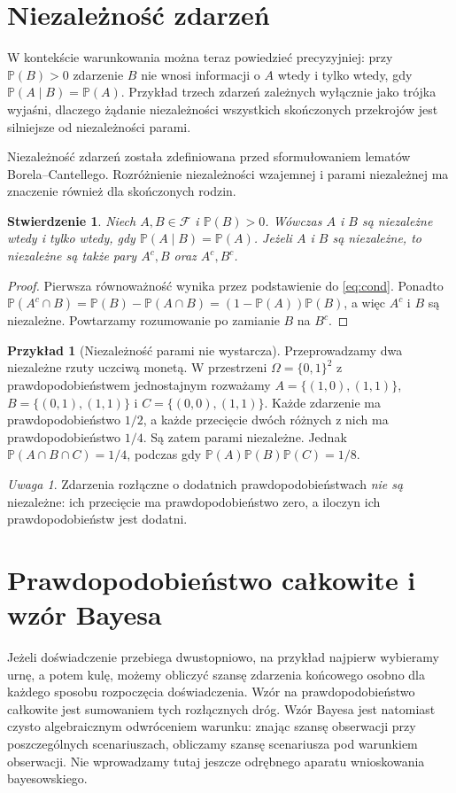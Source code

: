 \documentclass[11pt,a4paper,oneside]{report}
\numberwithin{equation}{chapter}
\theoremstyle{plain}
\newtheorem{stwierdzenie}[twierdzenie]{Stwierdzenie}
\theoremstyle{definition}
\newtheorem{przyklad}{Przykład}[chapter]
\theoremstyle{remark}
\newtheorem{uwaga}{Uwaga}[chapter]
\newcommand{\Prob}{\mathbb{P}}
\begin{document}
\section{Niezależność zdarzeń}
W kontekście warunkowania można teraz powiedzieć precyzyjniej:
przy $\Prob(B)>0$ zdarzenie $B$ nie wnosi informacji o $A$
wtedy i tylko wtedy, gdy $\Prob(A\mid B)=\Prob(A)$.
Przykład trzech zdarzeń zależnych wyłącznie jako trójka
wyjaśni, dlaczego żądanie niezależności wszystkich skończonych
przekrojów jest silniejsze od niezależności parami.

Niezależność zdarzeń została zdefiniowana przed sformułowaniem
lematów Borela--Cantellego. Rozróżnienie niezależności wzajemnej
i parami niezależnej ma znaczenie również dla skończonych rodzin.


\begin{stwierdzenie}
Niech $A,B\in\mathcal F$ i $\Prob(B)>0$.
Wówczas $A$ i $B$ są niezależne wtedy i tylko wtedy, gdy
$\Prob(A\mid B)=\Prob(A)$. Jeżeli $A$ i $B$ są niezależne,
to niezależne są także pary $A^c,B$ oraz $A^c,B^c$.
\end{stwierdzenie}
\begin{proof}
Pierwsza równoważność wynika przez podstawienie do \eqref{eq:cond}.
Ponadto $\Prob(A^c\cap B)=\Prob(B)-\Prob(A\cap B)
=(1-\Prob(A))\Prob(B)$, a więc $A^c$ i $B$ są niezależne.
Powtarzamy rozumowanie po zamianie $B$ na $B^c$.
\end{proof}

\begin{przyklad}[Niezależność parami nie wystarcza]
Przeprowadzamy dwa niezależne rzuty uczciwą monetą.
W przestrzeni $\Omega=\{0,1\}^2$ z prawdopodobieństwem jednostajnym
rozważamy $A=\{(1,0),(1,1)\}$,
$B=\{(0,1),(1,1)\}$ i $C=\{(0,0),(1,1)\}$.
Każde zdarzenie ma prawdopodobieństwo $1/2$, a każde przecięcie
dwóch różnych z nich ma prawdopodobieństwo $1/4$.
Są zatem parami niezależne. Jednak $\Prob(A\cap B\cap C)=1/4$,
podczas gdy $\Prob(A)\Prob(B)\Prob(C)=1/8$.
\end{przyklad}

\begin{uwaga}
Zdarzenia rozłączne o dodatnich prawdopodobieństwach \emph{nie są}
niezależne: ich przecięcie ma prawdopodobieństwo zero,
a iloczyn ich prawdopodobieństw jest dodatni.
\end{uwaga}

\section{Prawdopodobieństwo całkowite i wzór Bayesa}
Jeżeli doświadczenie przebiega dwustopniowo, na przykład najpierw
wybieramy urnę, a potem kulę, możemy obliczyć szansę zdarzenia
końcowego osobno dla każdego sposobu rozpoczęcia doświadczenia.
Wzór na prawdopodobieństwo całkowite jest sumowaniem tych
rozłącznych dróg. Wzór Bayesa jest natomiast czysto algebraicznym
odwróceniem warunku: znając szansę obserwacji przy poszczególnych
scenariuszach, obliczamy szansę scenariusza pod warunkiem obserwacji.
Nie wprowadzamy tutaj jeszcze odrębnego aparatu wnioskowania
bayesowskiego.
\end{document}
